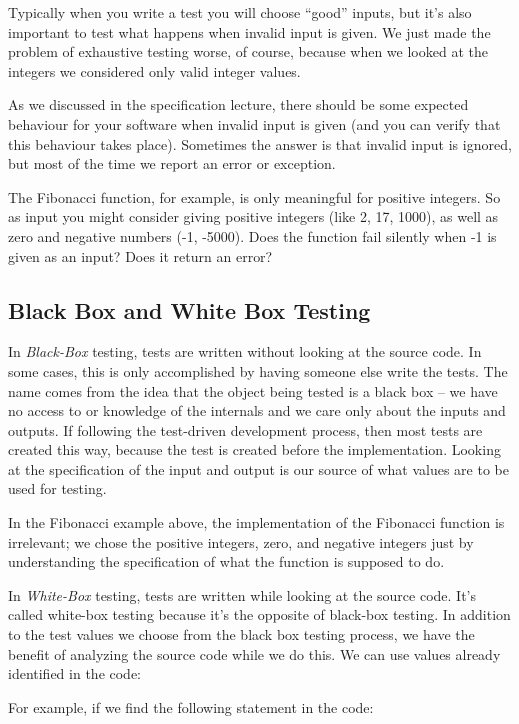 Typically when you write a test you will choose ``good'' inputs, but it's also important to test what happens when invalid input is given. We just made the problem of exhaustive testing worse, of course, because when we looked at the integers we considered only valid integer values.

As we discussed in the specification lecture, there should be some expected behaviour for your software when invalid input is given (and you can verify that this behaviour takes place). Sometimes the answer is that invalid input is ignored, but most of the time we report an error or exception.

The Fibonacci function, for example, is only meaningful for positive integers. So as input you might consider giving positive integers (like 2, 17, 1000), as well as zero and negative numbers (-1, -5000). Does the function fail silently when -1 is given as an input? Does it return an error? 

\subsection*{Black Box and White Box Testing}
In \emph{Black-Box} testing, tests are written without looking at the source code. In some cases, this is only accomplished by having someone else write the tests. The name comes from the idea that the object being tested is a black box -- we have no access to or knowledge of the internals and we care only about the inputs and outputs. If following the test-driven development process, then most tests are created this way, because the test is created before the implementation. Looking at the specification of the input and output is our source of what values are to be used for testing.

In the Fibonacci example above, the implementation of the Fibonacci function is irrelevant; we chose the positive integers, zero, and negative integers just by understanding the specification of what the function is supposed to do.

In \emph{White-Box} testing, tests are written while looking at the source code. It's called white-box testing because it's the opposite of black-box testing. In addition to the test values we choose from the black box testing process, we have the benefit of analyzing the source code while we do this. We can use values already identified in the code:

For example, if we find the following statement in the code:

